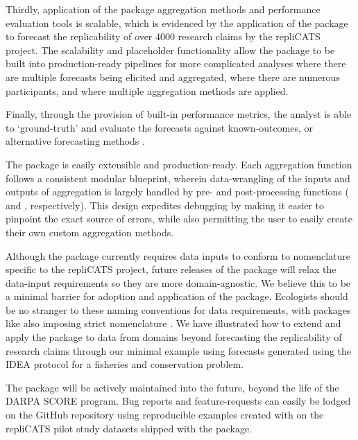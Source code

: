 \documentclass[article]{jss}
\newcommand{\fct}[1]{\code{#1()}}
\begin{document}
Thirdly, application of the  package aggregation methods
and performance evaluation tools is scalable, which is evidenced by the
application of the  package to forecast the replicability
of over 4000 research claims by the repliCATS project. The scalability
and placeholder functionality allow the  package to be
built into production-ready pipelines for more complicated analyses
where there are multiple forecasts being elicited and aggregated, where
there are numerous participants, and where multiple aggregation methods
are applied.

Finally, through the provision of built-in performance metrics, the
analyst is able to `ground-truth' and evaluate the forecasts against
known-outcomes, or alternative forecasting methods
\citep[e.g.][]{Arlidge2020}.

The  package is easily extensible and production-ready.
Each aggregation function follows a consistent modular blueprint,
wherein data-wrangling of the inputs and outputs of aggregation is
largely handled by pre- and post-processing functions
(\fct{preprocess_judgements} and \fct{postprocess_judgements},
respectively). This design expedites debugging by making it easier to
pinpoint the exact source of errors, while also permitting the user to
easily create their own custom aggregation methods.

Although the package currently requires data inputs to conform to
nomenclature specific to the repliCATS project, future releases of the
 package will relax the data-input requirements so they
are more domain-agnostic. We believe this to be a minimal barrier for
adoption and application of the  package. Ecologists
should be no stranger to these naming conventions for data requirements,
with packages like  also imposing strict nomenclature
\citep{veganpkg2020}. We have illustrated how to extend and apply the
package to data from domains beyond forecasting the replicability of
research claims through our minimal example using forecasts generated
using the IDEA protocol for a fisheries and conservation problem.

The package will be actively maintained into the future, beyond the life
of the DARPA SCORE program. Bug reports and feature-requests can easily
be lodged on the  GitHub repository using reproducible
examples created with  \citep{reprexpkg2020} on the
repliCATS pilot study datasets shipped with the  package.
\end{document}
